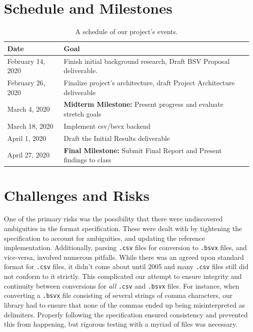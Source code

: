 \documentclass[10pt]{article}
\begin{document}
\section*{Schedule and Milestones}

\begin{table}[H]
\centering
\begin{tabular}{|p{80pt}|p{375pt}|}
\hline
\textbf{Date} & \textbf{Goal} \\ \hline
February 14, 2020 & Finish initial background research, Draft BSV Proposal deliverable. \\ \hline
February 26, 2020 & Finalize project's architecture, draft Project Architecture deliverable\\ \hline
March 4, 2020 & \textbf{Midterm Milestone:} Present progress and evaluate stretch goals \\ \hline
March 18, 2020 & Implement csv/bsvx backend\\ \hline
April 1, 2020 & Draft the Initial Results deliverable \\ \hline
April 27, 2020& \textbf{Final Milestone:} Submit Final Report and Present findings to class \\ \hline
\end{tabular}
\caption{A schedule of our project's events.}
\label{tab:approach_schedule}
\end{table}

\section*{Challenges and Risks}

One of the primary risks was the possibility that there were undiscovered ambiguities in the format specification.
These were dealt with by tightening the specification to account for ambiguities, and updating the reference implementation.
Additionally, parsing \texttt{.csv} files for conversion to \texttt{.bsvx} files, and vice-versa, involved numerous pitfalls.
While there was an agreed upon standard format for \texttt{.csv} files, it didn’t come about until 2005 and many \texttt{.csv} files still did not conform to it strictly.
This complicated our attempt to ensure integrity and continuity between conversions for \textit{all} \texttt{.csv} and \texttt{.bsvx} files.
For instance, when converting a \texttt{.bsvx} file consisting of several strings of comma characters, our library had to ensure that none of the commas ended up being misinterpreted as delimiters.
Properly following the specification ensured consistency and prevented this from happening, but rigorous testing with a myriad of files was necessary.
\end{document}
